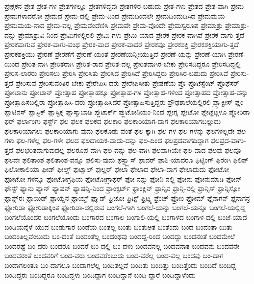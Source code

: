 {ಪ್ರೇಕ್ಷಕನ
ಪ್ರೇತ
ಪ್ರೇತ-ಗಳ
ಪ್ರೇತಗಳಲ್ಲೂ
ಪ್ರೇತಗಳಿದ್ದವು
ಪ್ರೇತಗಳಿರ-ಬಹುದು
ಪ್ರೇತ-ಗಳು
ಪ್ರೇತದ
ಪ್ರೇತ-ವಾಗಿ
ಪ್ರೇಮ
ಪ್ರೇಮಗಳಾದರೋ
ಪ್ರೇಮದ
ಪ್ರೇಮ-ದಲ್ಲಿ
ಪ್ರೇಮ-ದಿಂದ
ಪ್ರೇಮದಿಂದಲೇ
ಪ್ರೇಮದಿಂದುದಿಸಿದ
ಪ್ರೇಮಮಯ
ಪ್ರೇಮಮಯ-ನಾದ
ಪ್ರೇಮ-ವಲ್ಲ
ಪ್ರೇಮವೆಂದೆಣಿಸಿ
ಪ್ರೇಮವೇ
ಪ್ರೇಮ-ವೊಂದೇ
ಪ್ರೇಮಸ್ವರೂಪ
ಪ್ರೇಮಾಶ್ರು
ಪ್ರೇಮಾಶ್ರು-ವನ್ನು
ಪ್ರೇಮಾಶ್ರುವಿ-ನಿಂದ
ಪ್ರೇಮಿಗಳಲ್ಲಿರಲಿ
ಪ್ರೇಮಿ-ಗಳು
ಪ್ರೇಮಿ-ಯಾದ
ಪ್ರೇರಕ
ಪ್ರೇರಕ-ವಾಗಿವೆ
ಪ್ರೇರಕ-ವಾಗು-ತ್ತದೆ
ಪ್ರೇರಕವಾಗುವ
ಪ್ರೇರಕ-ವಾಗು-ವಂಥ
ಪ್ರೇರಕ-ವಾದ
ಪ್ರೇರಕ-ವಾದರೆ
ಪ್ರೇರಕವೂ
ಪ್ರೇರಕಶಕ್ತಿ
ಪ್ರೇರಕಶಕ್ತಿಯಾಗು-ತ್ತದೆ
ಪ್ರೇರಕಶಕ್ತಿಯು
ಪ್ರೇರಣೆ
ಪ್ರೇರಣೆಗೆ
ಪ್ರೇರಣೆ-ಯಂತೆ
ಪ್ರೇರಣೆಯನ್ನೀಯುತ್ತಿದೆ
ಪ್ರೇರಣೆ-ಯನ್ನು
ಪ್ರೇರಣೆ-ಯಾಗಿ
ಪ್ರೇರಣೆ-ಯಿಂದ
ಪ್ರೇರಿತ-ನಾಗಿ
ಪ್ರೇರಿತರಾಗಿ
ಪ್ರೇರಿತ-ರಾದ
ಪ್ರೇರಿತ-ವಲ್ಲ
ಪ್ರೇರಿತವಾಗಿರ-ಬೇಕು
ಪ್ರೇರಿಸದಿದ್ದರೂ
ಪ್ರೇರಿಸದಿದ್ದಲ್ಲಿ
ಪ್ರೇರಿಸ-ಲಾರರು
ಪ್ರೇರಿಸಲು
ಪ್ರೇರಿಸಿ
ಪ್ರೇರಿಸಿತು
ಪ್ರೇರಿಸಿದ
ಪ್ರೇರಿಸಿದೆ
ಪ್ರೇರಿಸಿದ್ದರು
ಪ್ರೇರಿಸಿರ-ಬಹುದು
ಪ್ರೇರಿಸಿವೆ
ಪ್ರೇರಿಸು-ತ್ತದೆ
ಪ್ರೇರಿಸುವ
ಪ್ರೇರಿಸುವಂತಿರ-ಬೇಕು
ಪ್ರೇರೇಪಿಸಿ-ದರು
ಪ್ರೇರೇಪಿಸೀತು
ಪ್ರೇಷಣೆಯ
ಪ್ರೊ
ಪ್ರೊಟೆಸ್ಟೆಂಟ್
ಪ್ರೊಫೆಸರ್
ಪ್ರೋಟಾನು
ಪ್ರೋಟಾನ್
ಪ್ರೋತ್ಸಾಹ
ಪ್ರೋತ್ಸಾಹಕ್ಕೂ
ಪ್ರೋತ್ಸಾಹ-ಗಳ
ಪ್ರೋತ್ಸಾಹ-ಗಳಿಂದ
ಪ್ರೋತ್ಸಾಹದ
ಪ್ರೋತ್ಸಾಹ-ವನ್ನು
ಪ್ರೋತ್ಸಾಹಿಸಬಲ್ಲಿರಾ
ಪ್ರೋತ್ಸಾಹಿಸಿ-ದರು
ಪ್ರೋತ್ಸಾಹಿಸಿದರೆ
ಪ್ರೋತ್ಸಾಹಿಸುತ್ತಿದ್ದರು
ಪ್ರೌಢಶಾಲೆಯಲ್ಲಿರಲಿ
ಪ್ರ್ಯಾಕ್ಟೀಸ್
ಪ್ಲಂ
ಪ್ಲಾಟಿನಸ್
ಪ್ಲಾಸ್ಟಿಕ್
ಪ್ಲಾಸ್ಟಿಕ್ನ
ಪ್ಲಾಸ್ಮಾಬಾಡಿ
ಪ್ಲುಟಾರ್ಕ್
ಪ್ಲುಟೋನಿಯಂ-ನಿಂದ
ಪ್ಲೇಗ್ನ
ಪ್ಲೇಟೋ
ಪ್ಲೇಟ್ಲೆಟ್ಗಳೂ
ಪ್ಲೋರಿಡಾ
ಫರ್
ಫರ್ಲಾಂಗು
ಫರ್ಸ್ಟ್
ಫಲ
ಫಲಕ
ಫಲಕದ
ಫಲಕಾರಿ
ಫಲಕಾರಿಯಾಗ-ದಾಗ
ಫಲಕಾರಿಯಾಗಬಲ್ಲುದು
ಫಲಕಾರಿಯಾಗಲು
ಫಲಕಾರಿಯಾಗು-ವುದು
ಫಲಕೊಡು-ವಂತೆ
ಫಲ-ಕ್ಕಾಗಿ
ಫಲ-ಗಳ
ಫಲ-ಗಳನ್ನು
ಫಲಗಳಲ್ಲದೇ
ಫಲ-ಗಳು
ಫಲ-ಗಳೆಲ್ಲ
ಫಲ-ಗಳೇ
ಫಲದ
ಫಲದಾಯಕ-ವಾದು-ದನ್ನು
ಫಲ-ದಿಂದ
ಫಲಪ್ರದವಾಗದಿದ್ದಾಗ
ಫಲಪ್ರದ-ವಾಗು-ತ್ತದೆ
ಫಲಭರಿತವಾಗುವುದಲ್ಲ
ಫಲರೂಪ-ವಾಗಿ
ಫಲ-ವನ್ನು
ಫಲ-ವಾಗಿ
ಫಲವಾಗಿಯೇ
ಫಲ-ವಾದ
ಫಲವು
ಫಲವೂ
ಫಲವೇ
ಫಲಿತಾಂಶ
ಫಲಿತಾಂಶ-ವನ್ನೂ
ಫಲಿಸು-ವುದು
ಫಸ್ಟ್ಕ್ಲಾಸ್
ಫಾದರ್
ಫಾಶಿ-ಯಾದರೂ
ಫಿಟ್ಟಿಂಗ್
ಫಿರಂಗಿ
ಫಿಲಿಪ್
ಫಿಲೋಕಾಲಿಯಾ
ಫೀಡ್
ಫೀಲ್ಡ್
ಫುಟ್ಬಾಲ್
ಫುಲ್ಲರ್
ಫೇಲಾ
ಫೇಲಾದ
ಫೇಲಾ-ದಾಗ
ಫೇಲಾದುದು
ಫೋಟೋ
ಫೋಟೋ-ಗಳನ್ನೂ
ಫೋಟೋಗ್ರಫಿಯ
ಫೋಟೋಗ್ರಾಫರ್
ಫೋ-ನನ್ನು
ಫೋನಿ-ನಲ್ಲಿ
ಫೋನು
ಫೋನುಮಾಡಿ
ಫೋನ್
ಫೌಸ್ಟ್
ಫ್ಯಾನು
ಫ್ಯಾನ್
ಫ್ಯಾಷನ್
ಫ್ಯಾಷನ್ನಿ-ನಿಂದ
ಫ್ರಾಂಕ್ಫರ್ಟ್
ಫ್ರಾಂಕ್ಲಿನ್
ಫ್ರಾನ್ಸಿನ
ಫ್ರಾನ್ಸಿ-ನಲ್ಲಿ
ಫ್ರಾನ್ಸಿಸ್
ಫ್ರಾನ್ಸಿಸ್ಕೋ
ಫ್ರಾನ್ಸ್ಈ
ಫ್ರಾಯಿಡ್
ಫ್ರಾಯ್ಡನ
ಫ್ರಾಯ್ಡ್
ಫ್ರಾೖಡ್
ಫ್ರಿಜೋ
ಫ್ರಿಟ್ಸ್
ಫ್ರಿಟ್ಸ್ನ
ಫ್ರೆಂಚ್
ಫ್ರೋಂ
ಫ್ರೋಮ್
ಫ್ಲೆನಾಗನ್
ಫ್ಲೆನಾಗನ್ರ
ಫ್ಲೋರಿಡಾ
ಫ್ಲೋರಿಡಾಕ್ಕಿಂತ
ಫ್ಲೋರಿಡಾ-ದಲ್ಲಿರುವ
ಬಂಗಲೆ-ಗಾಗಿ
ಬಂಗಲೆ-ಯನ್ನು
ಬಂಗಲೆ-ಯನ್ನೂ
ಬಂಗಲೆ-ಯಲ್ಲಿದ್ದ
ಬಂಗಲೆಯೊಂದರ
ಬಂಗಲೆಯೊಂದು
ಬಂಗಾರದ
ಬಂಗಾಲ
ಬಂಗಾಲಿ-ಯಲ್ಲಿ
ಬಂಗಾಳದ
ಬಂಗಾಳ-ದಲ್ಲಿ
ಬಂಜೆ-ಯಾದ
ಬಂಡಿಯನ್ನೆಳೆ-ಯುವ
ಬಂಡುಗಾರ
ಬಂಡೆಯ
ಬಂತಲ್ಲ
ಬಂತು
ಬಂತುಆತ
ಬಂತೆಂದು
ಬಂದ
ಬಂದಂತಾ-ಯಿತು
ಬಂದಂತಿಲ್ಲವೆಂಬುದು
ಬಂ-ದಂತೆ
ಬಂದಂತೆಲ್ಲ
ಬಂದಂಥವು
ಬಂದದ್ದ-ರಿಂದ
ಬಂದದ್ದು
ಬಂದನಂತೆ
ಬಂದಮೇಲೆ
ಬಂದರಷ್ಟೆ
ಬಂ-ದರು
ಬಂದರೂ
ಬಂದರೆ
ಬಂ-ದಲ್ಲಿ
ಬಂ-ದಳು
ಬಂದವನಲ್ಲ
ಬಂದವನಾತ
ಬಂದವನು
ಬಂದವನೇ
ಬಂದವರಂತೆ
ಬಂದವರಿಗೆ
ಬಂದ-ವರು
ಬಂದವರೆಂಬುದು
ಬಂದ-ವರೆಲ್ಲ
ಬಂದ-ವಲ್ಲ
ಬಂದವು
ಬಂ-ದಾಗ
ಬಂದಾಗಲಂತೂ
ಬಂ-ದಾಗಲೂ
ಬಂದಾಗಲೆಲ್ಲ
ಬಂದಿತಲ್ಲವೆ
ಬಂದಿತು
ಬಂದಿತ್ತು
ಬಂದಿತ್ತೆಂದು
ಬಂದಿದೆ
ಬಂದಿದ್ದ
ಬಂದಿದ್ದರು
ಬಂದಿದ್ದರೂ
ಬಂದಿದ್ದಳು
ಬಂದಿದ್ದಾಗ
ಬಂದಿದ್ದಾನೆ
ಬಂದಿ-ದ್ದಾರೆ
ಬಂದಿದ್ದಾಳೆಂದು
}
